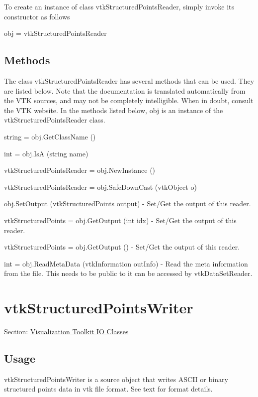 To create an instance of class vtk\-Structured\-Points\-Reader, simply invoke its constructor as follows \begin{DoxyVerb}  obj = vtkStructuredPointsReader
\end{DoxyVerb}
 \hypertarget{vtkwidgets_vtkxyplotwidget_Methods}{}\subsection{Methods}\label{vtkwidgets_vtkxyplotwidget_Methods}
The class vtk\-Structured\-Points\-Reader has several methods that can be used. They are listed below. Note that the documentation is translated automatically from the V\-T\-K sources, and may not be completely intelligible. When in doubt, consult the V\-T\-K website. In the methods listed below, {\ttfamily obj} is an instance of the vtk\-Structured\-Points\-Reader class. 
\begin{DoxyItemize}
\item {\ttfamily string = obj.\-Get\-Class\-Name ()}  
\item {\ttfamily int = obj.\-Is\-A (string name)}  
\item {\ttfamily vtk\-Structured\-Points\-Reader = obj.\-New\-Instance ()}  
\item {\ttfamily vtk\-Structured\-Points\-Reader = obj.\-Safe\-Down\-Cast (vtk\-Object o)}  
\item {\ttfamily obj.\-Set\-Output (vtk\-Structured\-Points output)} -\/ Set/\-Get the output of this reader.  
\item {\ttfamily vtk\-Structured\-Points = obj.\-Get\-Output (int idx)} -\/ Set/\-Get the output of this reader.  
\item {\ttfamily vtk\-Structured\-Points = obj.\-Get\-Output ()} -\/ Set/\-Get the output of this reader.  
\item {\ttfamily int = obj.\-Read\-Meta\-Data (vtk\-Information out\-Info)} -\/ Read the meta information from the file. This needs to be public to it can be accessed by vtk\-Data\-Set\-Reader.  
\end{DoxyItemize}\hypertarget{vtkio_vtkstructuredpointswriter}{}\section{vtk\-Structured\-Points\-Writer}\label{vtkio_vtkstructuredpointswriter}
Section\-: \hyperlink{sec_vtkio}{Visualization Toolkit I\-O Classes} \hypertarget{vtkwidgets_vtkxyplotwidget_Usage}{}\subsection{Usage}\label{vtkwidgets_vtkxyplotwidget_Usage}
vtk\-Structured\-Points\-Writer is a source object that writes A\-S\-C\-I\-I or binary structured points data in vtk file format. See text for format details.

